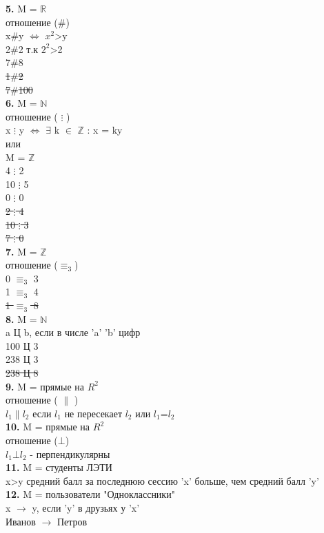 \documentclass[a4paper,12pt]{article}   %
\begin{document}
\textbf{5.} M = $\mathbb{R}$ \\
отношение (\#) \\
x$\#$y $\iff$ $x^2$>y \\
2$\#$2 т.к $2^2$>2 \\
7$\#$8 \\
\sout{1$\#$2} \\
\sout{7$\#$100} \\
\textbf{6.} M = $\mathbb{N}$ \\
отношение ( $\vdots$ ) \\
x $\vdots$ y $\iff$ $\exists$ k $\in$ $\mathbb{Z}$ : x = ky \\
или \\
M = $\mathbb{Z}$ \\
4 $\vdots$ 2 \\
10 $\vdots$ 5 \\
0 $\vdots$ 0 \\
\sout{2 $\vdots$ 4} \\
\sout{10 $\vdots$ 3} \\
\sout{7 $\vdots$ 0} \\
\textbf{7.} M = $\mathbb{Z}$ \\
отношение ($\equiv_3$) \\
0 $\equiv_3$ 3 \\
1 $\equiv_3$ 4 \\
\sout{1 $\equiv_3$ 8} \\
\textbf{8.} M = $\mathbb{N}$ \\
a Ц b, если в числе 'a' 'b' цифр \\
100 Ц 3 \\
238 Ц 3 \\
\sout{238 Ц 8} \\
\textbf{9.} M = прямые на $R^2$ \\
отношение ( $\|$ ) \\
$l_1 \| l_2$ если $l_1$ не пересекает $l_2$ или $l_1$=$l_2$ \\
\textbf{10.} M = прямые на $R^2$ \\
отношение ($\bot$) \\
$l_1 \bot l_2$ - перпендикулярны \\
\textbf{11.} M = студенты ЛЭТИ \\
x>y средний балл за последнюю сессию 'x' больше, чем средний балл 'y' \\
\textbf{12.} M = пользователи "Одноклассники" \\
x $\rightarrow$ y, если 'y' в друзьях у 'x' \\
Иванов $\rightarrow$ Петров \\
\end{document}
